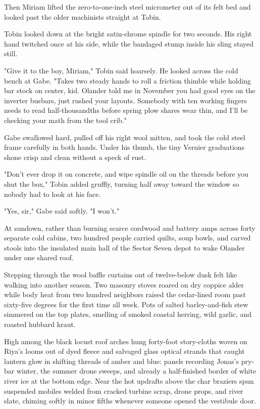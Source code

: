 Then Miriam lifted the zero-to-one-inch steel micrometer out of its felt bed and looked past the older machinists straight at Tobin.

Tobin looked down at the bright satin-chrome spindle for two seconds. His right hand twitched once at his side, while the bandaged stump inside his sling stayed still.

"Give it to the boy, Miriam," Tobin said hoarsely. He looked across the cold bench at Gabe. "Takes two steady hands to roll a friction thimble while holding bar stock on center, kid. Olander told me in November you had good eyes on the inverter busbars, just rushed your layouts. Somebody with ten working fingers needs to read half-thousandths before spring plow shares wear thin, and I'll be checking your math from the tool crib."

Gabe swallowed hard, pulled off his right wool mitten, and took the cold steel frame carefully in both hands. Under his thumb, the tiny Vernier graduations shone crisp and clean without a speck of rust.

"Don't ever drop it on concrete, and wipe spindle oil on the threads before you shut the box," Tobin added gruffly, turning half away toward the window so nobody had to look at his face.

"Yes, sir," Gabe said softly. "I won't."

\bigskip

At sundown, rather than burning scarce cordwood and battery amps across forty separate cold cabins, two hundred people carried quilts, soup bowls, and carved stools into the insulated main hall of the Sector Seven depot to wake Olander under one shared roof.

Stepping through the wool baffle curtains out of twelve-below dusk felt like walking into another season. Two masonry stoves roared on dry coppice alder while body heat from two hundred neighbors raised the cedar-lined room past sixty-five degrees for the first time all week. Pots of salted barley-and-fish stew simmered on the top plates, smelling of smoked coastal herring, wild garlic, and roasted hubbard kraut.

High among the black locust roof arches hung forty-foot story-cloths woven on Riya's looms out of dyed fleece and salvaged glass optical strands that caught lantern glow in shifting threads of amber and blue: panels recording Jonas's pry-bar winter, the summer drone sweeps, and already a half-finished border of white river ice at the bottom edge. Near the hot updrafts above the char braziers spun suspended mobiles welded from cracked turbine scrap, drone props, and river slate, chiming softly in minor fifths whenever someone opened the vestibule door.

